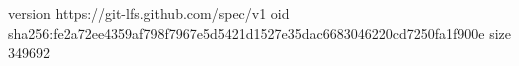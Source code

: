 version https://git-lfs.github.com/spec/v1
oid sha256:fe2a72ee4359af798f7967e5d5421d1527e35dac6683046220cd7250fa1f900e
size 349692
